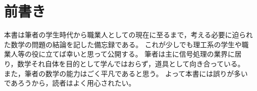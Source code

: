 \part{前書き}
    本書は筆者の学生時代から職業人としての現在に至るまで，考える必要に迫られた数学の問題の結論を記した備忘録である。
    これが少しでも理工系の学生や職業人等の役に立てば幸いと思って公開する。
    筆者は主に信号処理の業界に居り，数学それ自体を目的として学んではおらず，道具として向き合っている。
    また，筆者の数学の能力はごく平凡であると思う。
    よって本書には誤りが多いであろうから，読者はよく用心されたい。
